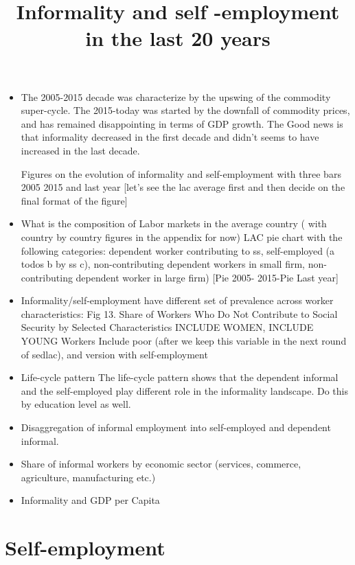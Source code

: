 \documentclass[english]{article}
\begin{document}
\title{Informality and self -employment in the last 20 years}
\maketitle
\begin{itemize}
\item The 2005-2015 decade was characterize by the upswing of the commodity super-cycle.  The 2015-today was started by the downfall of commodity prices, and has remained disappointing in terms of GDP growth. The Good news is that informality decreased in the first decade and didn't seems to have increased in the last decade. 

 Figures on the evolution of informality and self-employment with three bars 2005 2015 and last year [let's see the lac average first and then decide on the final format of the figure]

    \item What is the composition of Labor markets in the average country ( with country by country figures in the appendix for now) LAC pie chart with the following categories: dependent worker contributing to ss, self-employed (a todos b by ss c), non-contributing dependent workers in small firm, non-contributing dependent worker in large firm) [Pie 2005- 2015-Pie Last year]
    \item Informality/self-employment have different set of prevalence across worker characteristics:
    Fig 13. Share of Workers Who Do Not Contribute to Social Security by Selected Characteristics INCLUDE WOMEN, INCLUDE YOUNG Workers Include poor (after we keep this variable in the next round of sedlac), and version with self-employment 
    \item Life-cycle pattern 
    The life-cycle pattern shows that the dependent informal and the self-employed play different role in the informality landscape. Do this by education level as well.
    
    \item Disaggregation of informal employment into self-employed and dependent informal.
    \item Share of informal workers by economic sector (services, commerce, agriculture, manufacturing etc.)
    \item Informality and GDP per Capita
    
    
    \end{itemize}
    \section{Self-employment}
    
\end{document}
